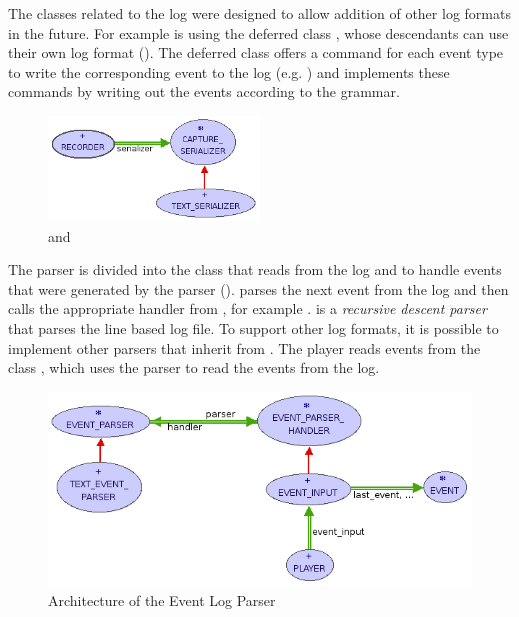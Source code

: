 The classes related to the log were designed to allow addition of other log formats in the future. For example  is using the deferred class , whose descendants can use their own log format (). The deferred class offers a command for each event type to write the corresponding event to the log (e.g. ) and  implements these commands by writing out the events according to the grammar.

\begin{figure}[ht]
  \centering
  \includegraphics[width=0.5\textwidth]{illustrations/implementation_serializer.png}
  \caption{ and }
  \label{fig:implementation_serializer}
\end{figure}

The parser is divided into the class  that reads from the log and  to handle events that were generated by the parser ().  parses the next event from the log and then calls the appropriate handler from , for example .  
 is a \emph{recursive descent parser} \cite{aho86} that parses the line based log file. To support other log formats, it is possible to implement other parsers that inherit from .
The player reads events from the class , which uses the parser to read the events from the log.

\begin{figure}[ht]
  \centering
  \includegraphics[width=1\textwidth]{illustrations/implementation_parser.png}
  \caption{Architecture of the Event Log Parser}
  \label{fig:implementation_parser}
\end{figure}


